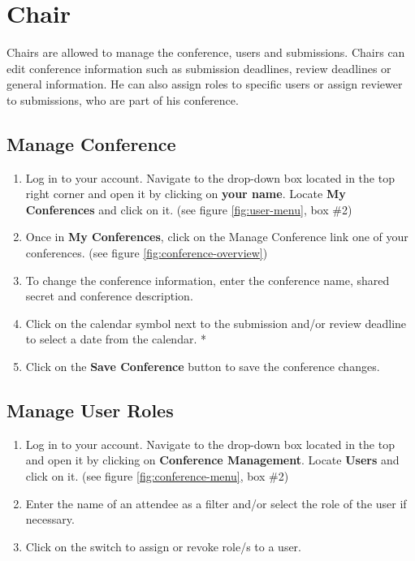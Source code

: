 \documentclass[nochapterpage,nopartpage,noheadingspace,numbersubsubsec,bigchapter,colorback,accentcolor=tud9c,10pt]{tudreport}
\begin{document}
  \chapter{Chair}

    Chairs are allowed to manage the conference, users and submissions. Chairs can edit conference information such as submission deadlines, review deadlines or general information. He can also assign roles to specific users or assign reviewer to submissions, who are part of his conference.

  \section{Manage Conference}
        \begin{enumerate}
            \item   Log in to your account. Navigate to the drop-down box located in the top right corner and open it by clicking on \textbf{your name}. Locate \textbf{My Conferences} and click on it. (see figure \ref{fig:user-menu}, box \#2)
            \item   Once in \textbf{My Conferences}, click on the Manage Conference link one of your conferences. (see figure \ref{fig:conference-overview})
            \item   To change the conference information, enter the conference name, shared secret and conference description.
            \item   Click on the calendar symbol next to the submission and/or review deadline to select a date from the calendar. *
            \item   Click on the \textbf{Save Conference} button to save the conference changes.
        \end{enumerate}

  \section{Manage User Roles}
        \begin{enumerate}
            \item   Log in to your account. Navigate to the drop-down box located in the top and open it by clicking on \textbf{Conference Management}. Locate \textbf{Users} and click on it. (see figure \ref{fig:conference-menu}, box \#2)
            \item   Enter the name of an attendee as a filter and/or select the role of the user if necessary.
            \item   Click on the switch to assign or revoke role/s to a user.
        \end{enumerate}
\end{document}
